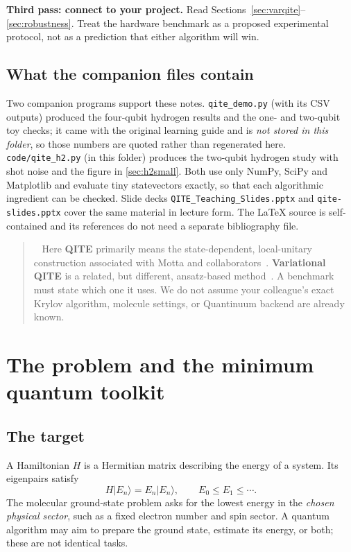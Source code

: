 \documentclass[11pt,a4paper]{article}
\newcommand{\ket}[1]{\lvert #1\rangle}
\newcommand{\lesson}[2]{\clearpage\section{#1}\label{#2}}
\newenvironment{caution}[1][Important distinction]{\par\smallskip\begin{quotation}\noindent{\bfseries\textcolor{alertred}{#1.}}\ }{\end{quotation}\smallskip}
\begin{document}
\textbf{Third pass: connect to your project.} Read Sections~\ref{sec:varqite}--\ref{sec:robustness}. Treat the hardware benchmark as a proposed experimental protocol, not as a prediction that either algorithm will win.

\subsection*{What the companion files contain}
Two companion programs support these notes. \texttt{qite\_demo.py} (with its CSV outputs) produced the four-qubit hydrogen results and the one- and two-qubit toy checks; it came with the original learning guide and is \emph{not stored in this folder}, so those numbers are quoted rather than regenerated here. \texttt{code/qite\_h2.py} (in this folder) produces the two-qubit hydrogen study with shot noise and the figure in \cref{sec:h2small}. Both use only NumPy, SciPy and Matplotlib and evaluate tiny statevectors exactly, so that each algorithmic ingredient can be checked. Slide decks \texttt{QITE\_Teaching\_Slides.pptx} and \texttt{qite-slides.pptx} cover the same material in lecture form. The \LaTeX{} source is self-contained and its references do not need a separate bibliography file.

\begin{caution}[Scope]
Here \textbf{QITE} primarily means the state-dependent, local-unitary construction associated with Motta and collaborators~\cite{motta}. \textbf{Variational QITE} is a related, but different, ansatz-based method~\cite{mcardle,yuan}. A benchmark must state which one it uses. We do not assume your colleague's exact Krylov algorithm, molecule settings, or Quantinuum backend are already known.
\end{caution}

\clearpage
\tableofcontents

\lesson{The problem and the minimum quantum toolkit}{sec:toolkit}
\subsection*{The target}
A Hamiltonian $H$ is a Hermitian matrix describing the energy of a system. Its eigenpairs satisfy
\[
H\ket{E_n}=E_n\ket{E_n},\qquad E_0\le E_1\le\cdots.
\]
The molecular ground-state problem asks for the lowest energy in the \emph{chosen physical sector}, such as a fixed electron number and spin sector. A quantum algorithm may aim to prepare the ground state, estimate its energy, or both; these are not identical tasks.
\end{document}
